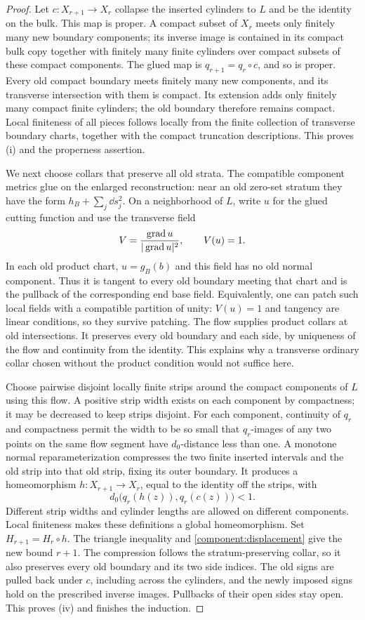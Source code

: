 \begin{proof}
Let $c:X_{r+1}\to X_r$ collapse the inserted cylinders to $L$ and be
the identity on the bulk.  This map is proper.  A compact subset of
$X_r$ meets only finitely many new boundary components; its inverse image
is contained in its compact bulk copy together with finitely many
finite cylinders over compact subsets of these compact components.
The glued map is $q_{r+1}=q_r\circ c$, and so is proper.
Every old compact boundary meets finitely many new components, and its
transverse intersection with them is compact.  Its extension adds
only finitely many compact finite cylinders; the old boundary therefore
remains compact.  Local finiteness of all pieces follows locally
from the finite collection of transverse boundary charts, together with
the compact truncation descriptions.  This proves (i) and the
properness assertion.

We next choose collars that preserve all old strata.  The compatible
component metrics glue on the enlarged reconstruction: near an old zero-set
stratum they have the form $h_B+\sum_j\dd s_j^2$.  On a neighborhood
of $L$, write $u$ for the glued cutting function and use the transverse
field
\[
 V=\frac{\operatorname{grad} u}{|\operatorname{grad} u|^2},\qquad V(u)=1.
\]
In each old product chart, $u=g_B(b)$ and this field has no old normal
component.  Thus it is tangent to every old boundary meeting that chart
and is the pullback of the corresponding end base field.  Equivalently,
one can patch such local fields with a compatible partition of unity:
$V(u)=1$ and tangency are linear conditions, so they survive patching.
The flow supplies product collars at old intersections.  It preserves
every old boundary and each side, by uniqueness of the flow and continuity
from the identity.  This explains why a transverse ordinary collar
chosen without the product condition would not suffice here.

Choose pairwise disjoint locally finite strips around the compact
components of $L$ using this flow.  A positive strip width exists on
each component by compactness; it may be decreased to keep strips
disjoint.  For each component, continuity of $q_r$ and compactness
permit the width to be so small that $q_r$-images of any two points
on the same flow segment have $d_0$-distance less than one.  A monotone normal
reparameterization compresses the two finite inserted intervals and
the old strip into that old strip, fixing its outer boundary.  It
produces a homeomorphism $h:X_{r+1}\to X_r$, equal to the identity
off the strips, with
\[
 d_0\bigl(q_r(h(z)),q_r(c(z))\bigr)<1.
\]
Different strip widths and cylinder lengths are allowed on different
components.  Local finiteness makes these definitions a global
homeomorphism.  Set $H_{r+1}=H_r\circ h$.  The triangle inequality
and \cref{component:displacement} give the new bound $r+1$.
The compression follows the stratum-preserving collar, so it also
preserves every old boundary and its two side indices.  The old signs
are pulled back under $c$, including across the cylinders, and the
newly imposed signs hold on the prescribed inverse images.  Pullbacks
of their open sides stay open.  This
proves (iv) and finishes the induction.
\end{proof}

